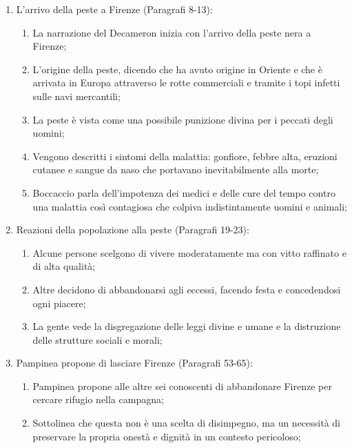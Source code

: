 \documentclass{article}
\begin{document}
\begin{enumerate}
    \item L'arrivo della peste a Firenze (Paragrafi 8-13):
        \begin{enumerate}[label*=\arabic*.]
            \item La narrazione del Decameron inizia con l'arrivo della peste nera a Firenze;
            \item L'origine della peste, dicendo che ha avuto origine in
                Oriente e che è arrivata in Europa attraverso le rotte commerciali e tramite
                i topi infetti sulle navi mercantili;
            \item La peste è vista come una possibile punizione divina per i peccati degli
                uomini;
            \item Vengono descritti i sintomi della malattia: gonfiore, febbre alta,
                eruzioni cutanee e sangue da naso che portavano inevitabilmente alla morte;
            \item Boccaccio parla dell'impotenza dei medici e delle cure del tempo contro una
                malattia così contagiosa che colpiva indistintamente uomini e animali;
        \end{enumerate}
    \item Reazioni della popolazione alla peste (Paragrafi 19-23):
        \begin{enumerate}[label*=\arabic*.]
            \item Alcune persone scelgono di vivere moderatamente ma con vitto raffinato e di
                alta qualità;
            \item Altre decidono di abbandonarsi agli eccessi, facendo festa e concedendosi
                ogni piacere;
            \item La gente vede la disgregazione delle leggi divine e umane e la distruzione
                delle strutture sociali e morali;
        \end{enumerate}
    \item Pampinea propone di lasciare Firenze (Paragrafi 53-65):
        \begin{enumerate}[label*=\arabic*.]
            \item Pampinea propone alle altre sei conoscenti di abbandonare Firenze per
                cercare rifugio nella campagna;
            \item Sottolinea che questa non è una scelta di disimpegno, ma un necessità di
                preservare la propria onestà e dignità in un contesto pericoloso;

\end{enumerate}
\end{enumerate}
\end{document}
